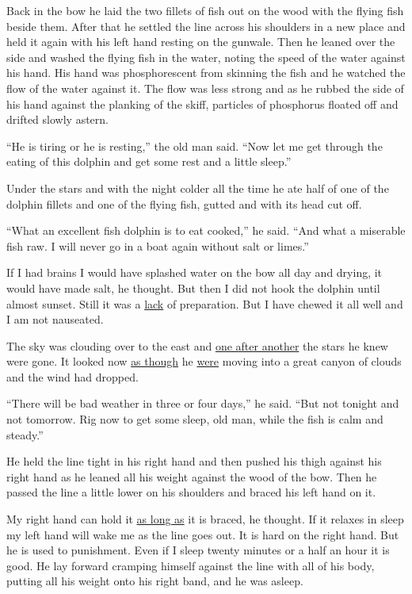 Back in the bow he laid the two fillets of fish out on the wood with the
flying fish beside them. After that he settled the line across his shoulders
in a new place and held it again with his left hand resting on the gunwale.
Then he leaned over the side and washed the flying fish in the water,
\gls{noting} the speed of the water against his hand. His hand was
phosphorescent from skinning the fish and he watched the flow of the water
against it. The flow was less strong and as he rubbed the side of his hand
against the planking of the skiff, \glspl{particle} of \gls{phosphorus}
floated off and drifted slowly \gls{astern}.

``He is tiring or he is resting,'' the old man said. ``Now let me get
through the eating of this dolphin and get some rest and a little sleep.''

Under the stars and with the night colder all the time he ate half of one
of the dolphin fillets and one of the flying fish, gutted and with its head
cut off.

``What an excellent fish dolphin is to eat cooked,'' he said. ``And what a
\gls{miserable} fish raw. I will never go in a boat again without salt or
limes.''

If I had brains I would have \gls{splashed} water on the bow all day and
drying, it would have made salt, he thought. But then I did not hook the
dolphin until almost sunset. Still it was a \uline{lack} of
\gls{preparation}. But I have chewed it all well and I am not
\gls{nauseated}.

The sky was clouding over to the east and \uline{one after another} the
stars he knew were gone. It looked now \uline{as though} he \uline{were}
moving into a great \gls{canyon} of clouds and the wind had dropped.

``There will be bad weather in three or four days,'' he said. ``But not
tonight and not tomorrow. Rig now to get some sleep, old man, while the fish
is calm and steady.''

He held the line tight in his right hand and then pushed his thigh against
his right hand as he leaned all his weight against the wood of the bow. Then
he passed the line a little lower on his shoulders and braced his left hand
on it.

My right hand can hold it \uline{as long as} it is braced, he thought. If it relaxes
in sleep my left hand will wake me as the line goes out. It is hard on the
right hand. But he is used to punishment. Even if I sleep twenty minutes or
a half an hour it is good. He lay forward cramping himself against the line
with all of his body, putting all his weight onto his right band, and he was
asleep.

